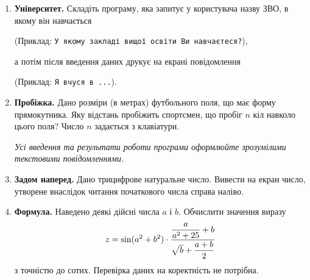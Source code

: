 \begin{enumerate}

\item \textbf{Університет.} Складіть програму, яка запитує у користувача назву ЗВО, в якому він навчається

(Приклад: \verb|У якому закладі вищої освіти Ви навчаєтеся?|),

а потім після введення даних друкує на екрані повідомлення

(Приклад: \verb|Я вчуся в ...|).

\item \textbf{Пробіжка.} Дано розміри (в метрах) футбольного поля, що має форму прямокутника. Яку відстань пробіжить спортсмен, що пробіг $n$ кіл навколо цього поля? Число $n$ задається з клавіатури.

{\itshape Усі введення та результати роботи програми оформлюйте зрозумілими текстовими повідомленнями.}

\item \textbf{Задом наперед.} Дано трицифрове натуральне число. Вивести на екран число, утворене внаслідок читання початкового числа справа наліво.

\item \textbf{Формула.} Наведено деякі дійсні числа $a$ і $b$. Обчислити значення виразу
$$
z=\sin(a^2+b^2)\cdot\dfrac{\dfrac{a}{a^2+25}+b}{\sqrt{\mathstrut b}+\dfrac{a+b}{ 2}}
$$
з точністю до сотих. Перевірка даних на коректність не потрібна.
\end{enumerate}








